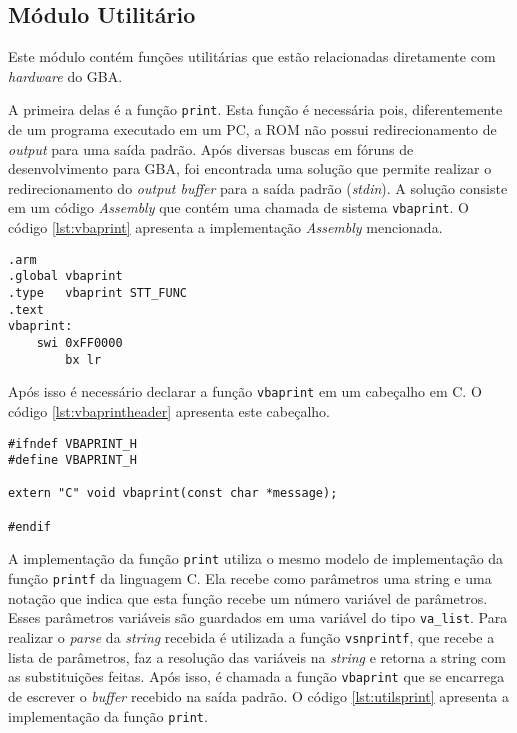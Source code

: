 \subsection{Módulo Utilitário}

Este módulo contém funções utilitárias que estão relacionadas diretamente com \textit{hardware} do GBA.

A primeira delas é a função \texttt{print}. Esta função é necessária pois, diferentemente de um programa executado em um PC, a ROM não possui redirecionamento de \textit{output} para uma saída padrão. Após diversas buscas em fóruns de desenvolvimento para GBA, foi encontrada uma solução que permite realizar o redirecionamento do \textit{output buffer} para a saída padrão (\textit{stdin}). A solução consiste em um código \textit{Assembly} que contém uma chamada de sistema \texttt{vbaprint}. O código \ref{lst:vbaprint} apresenta a implementação \textit{Assembly} mencionada.

\begin{lstlisting}[label={lst:vbaprint}, caption={Código \textit{Assembly} para a função \texttt{vbaprint}}]
.arm
.global vbaprint
.type   vbaprint STT_FUNC
.text
vbaprint:
    swi 0xFF0000
        bx lr
\end{lstlisting}

Após isso é necessário declarar a função \texttt{vbaprint} em um cabeçalho em C. O código \ref{lst:vbaprintheader} apresenta este cabeçalho.

\begin{lstlisting}[label={lst:vbaprintheader}, caption={Cabeçalho da função \texttt{vbaprint}}]
#ifndef VBAPRINT_H
#define VBAPRINT_H

extern "C" void vbaprint(const char *message);

#endif
\end{lstlisting}

A implementação da função \texttt{print} utiliza o mesmo modelo de implementação da função \texttt{printf} da linguagem C. Ela recebe como parâmetros uma string e uma notação que indica que esta função recebe um número variável de parâmetros. Esses parâmetros variáveis são guardados em uma variável do tipo \texttt{va\_list}. Para realizar o \textit{parse} da \textit{string} recebida é utilizada a função \texttt{vsnprintf}, que recebe a lista de parâmetros, faz a resolução das variáveis na \textit{string} e retorna a string com as substituições feitas. Após isso, é chamada a função \texttt{vbaprint} que se encarrega de escrever o \textit{buffer} recebido na saída padrão. O código \ref{lst:utilsprint} apresenta a implementação da função \texttt{print}.

